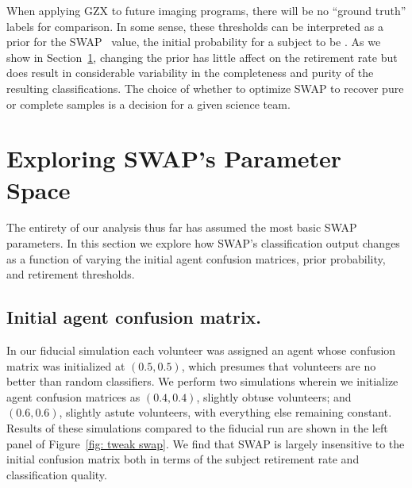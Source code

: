When applying GZX to future imaging programs, there will be no ``ground truth'' labels for comparison. In some sense, these thresholds can be interpreted as a prior for the SWAP \p~value, the initial probability for a subject to be \feat. As we show in Section~\ref{chap3: tweaking swap}, changing the prior has little affect on the retirement rate but does result in considerable variability in the completeness and purity of the resulting classifications. The choice of whether to optimize SWAP to recover pure or complete samples is a decision for a given science team.


\section{Exploring SWAP's Parameter Space} \label{chap3: tweaking swap}

The entirety of our analysis thus far has assumed the most basic SWAP parameters. In this section we explore how SWAP's classification output changes as a function of varying the initial agent confusion matrices, prior probability, and retirement thresholds.


\subsection{Initial agent confusion matrix.} 
In our fiducial simulation each volunteer was assigned an agent whose confusion matrix was initialized at $(0.5, 0.5)$, which presumes that volunteers are no better than random classifiers. We perform two simulations wherein we initialize agent confusion matrices as $(0.4, 0.4)$, slightly obtuse volunteers; and $(0.6, 0.6)$, slightly astute volunteers, with everything else remaining constant.  Results of these simulations compared to the fiducial run are shown in the left panel of Figure~\ref{fig: tweak swap}. We find that SWAP is largely insensitive to the initial confusion matrix  both in terms of the subject retirement rate and classification quality.  


